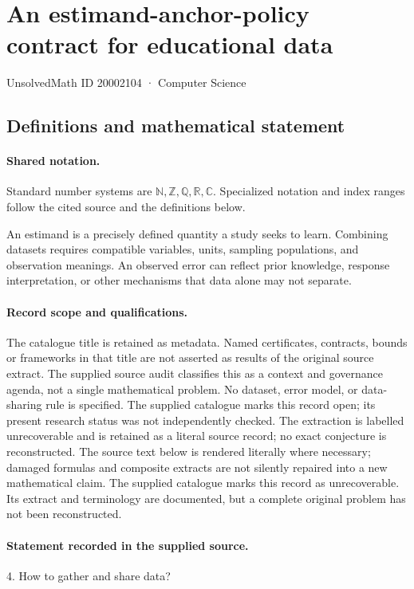 \documentclass[11pt]{article}
\begin{document}
\setcounter{section}{20002103}
\section{An estimand-anchor-policy contract for educational data}\label{20002104}
{\small\sffamily UnsolvedMath ID 20002104 · Computer Science}
\subsection{Definitions and mathematical statement}

\paragraph{Shared notation.}Standard number systems are $\mathbb N,\mathbb Z,\mathbb Q,\mathbb R,\mathbb C$. Specialized notation and index ranges follow the cited source and the definitions below.


An estimand is a precisely defined quantity a study seeks to learn. Combining datasets requires compatible variables, units, sampling populations, and observation meanings. An observed error can reflect prior knowledge, response interpretation, or other mechanisms that data alone may not separate.
\paragraph{Record scope and qualifications.}
The catalogue title is retained as metadata. Named certificates, contracts, bounds or frameworks in that title are not asserted as results of the original source extract.
The supplied source audit classifies this as a context and governance agenda, not a single mathematical problem. No dataset, error model, or data-sharing rule is specified. The supplied catalogue marks this record open; its present research status was not independently checked. The extraction is labelled unrecoverable and is retained as a literal source record; no exact conjecture is reconstructed.
The source text below is rendered literally where necessary; damaged formulas and composite extracts are not silently repaired into a new mathematical claim.
The supplied catalogue marks this record as unrecoverable. Its extract and terminology are documented, but a complete original problem has not been reconstructed.
\paragraph{Statement recorded in the supplied source.}
4. How to gather and share data?
\end{document}
